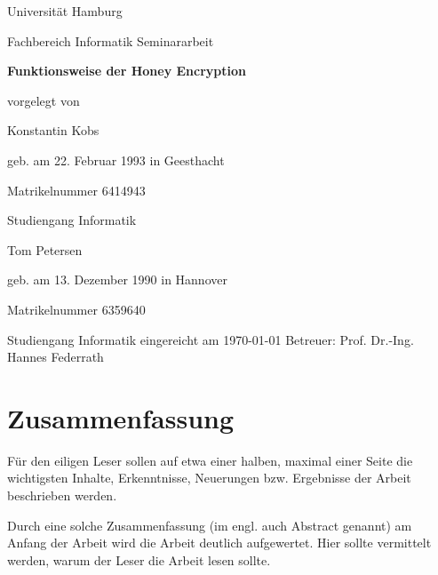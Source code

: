 \documentclass[12pt]{scrartcl}
\begin{document}
\newpage

\thispagestyle{empty}
\begin{center}\Large
Universität Hamburg \par
Fachbereich Informatik
\vfill
Seminararbeit
\vfill
{\Large\textsf{\textbf{Funktionsweise der Honey Encryption}}\par}
\vfill
vorgelegt von 
\par\bigskip
Konstantin Kobs \par
geb. am 22. Februar 1993 in Geesthacht \par
Matrikelnummer 6414943 \par
Studiengang Informatik
\par\bigskip
Tom Petersen \par
geb. am 13. Dezember 1990 in Hannover \par
Matrikelnummer 6359640 \par
Studiengang Informatik
\vfill
eingereicht am \today
\vfill 
Betreuer: Prof. Dr.-Ing. Hannes Federrath \par
\end{center}

\newpage
\section*{Zusammenfassung}

Für den eiligen Leser sollen auf etwa einer halben, maximal einer Seite die wichtigsten Inhalte, Erkenntnisse, Neuerungen bzw. Ergebnisse der Arbeit beschrieben werden. 

Durch eine solche Zusammenfassung (im engl. auch Abstract genannt) am Anfang der Arbeit wird die Arbeit deutlich aufgewertet. Hier sollte vermittelt werden, warum der Leser die Arbeit lesen sollte.

\newpage

\tableofcontents
\newpage













\newpage

\begingroup
\let\itshape\upshape


\endgroup
\end{document}
